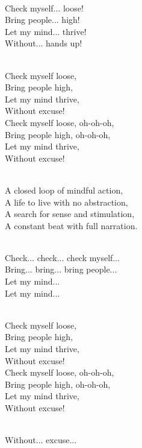 \begin{lyrics}
\\
Check myself... loose!\\
Bring people... high!\\
Let my mind... thrive!\\
Without... hands up!

\\
Check myself loose,\\
Bring people high,\\
Let my mind thrive,\\
Without excuse!\\
Check myself loose, oh-oh-oh,\\
Bring people high, oh-oh-oh,\\
Let my mind thrive,\\
Without excuse!

\\
A closed loop of mindful action,\\
A life to live with no abstraction,\\
A search for sense and stimulation,\\
A constant beat with full narration.

\\
Check... check... check myself...\\
Bring... bring... bring people...\\
Let my mind...\\
Let my mind...

\\
Check myself loose,\\
Bring people high,\\
Let my mind thrive,\\
Without excuse!\\
Check myself loose, oh-oh-oh,\\
Bring people high, oh-oh-oh,\\
Let my mind thrive,\\
Without excuse!

\\
Without... excuse...

\end{lyrics}

